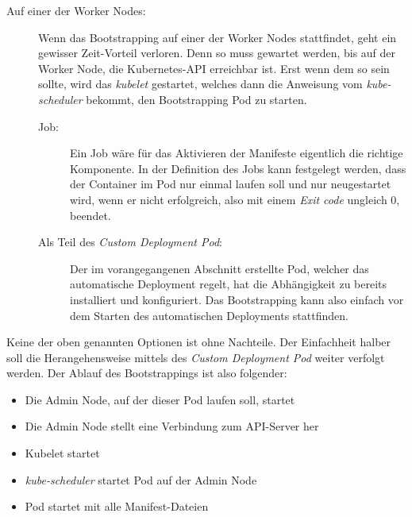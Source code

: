 \begin{description}
  \item[Auf einer der Worker Nodes:]
  Wenn das Bootstrapping auf einer der Worker Nodes stattfindet, geht ein gewisser
  Zeit-Vorteil verloren. Denn so muss gewartet werden, bis auf
  der Worker Node, die Kubernetes-API erreichbar ist. Erst wenn dem so sein sollte,
  wird das \emph{kubelet} gestartet, welches dann die Anweisung vom
  \emph{kube-scheduler} bekommt, den Bootstrapping Pod zu starten.
  \begin{description}
    \item[Job:]
    Ein Job wäre für das Aktivieren der Manifeste eigentlich die richtige
    Komponente.
    In der Definition des Jobs kann festgelegt werden, dass der Container
    im Pod nur einmal laufen soll und nur neugestartet wird, wenn er
    nicht erfolgreich, also mit einem \emph{Exit code} ungleich 0, beendet.
    \item[Als Teil des \emph{Custom Deployment Pod}:]
    Der im vorangegangenen Abschnitt erstellte Pod, welcher das automatische
    Deployment regelt, hat die Abhängigkeit zu  bereits
    installiert und konfiguriert.
    Das Bootstrapping kann also einfach vor dem Starten des automatischen
    Deployments stattfinden.
  \end{description}
\end{description}

Keine der oben genannten Optionen ist ohne Nachteile. Der Einfachheit halber
soll die Herangehensweise mittels des \emph{Custom Deployment Pod} weiter
verfolgt werden.
Der Ablauf des Bootstrappings ist also folgender:
\begin{itemize}
  \item Die Admin Node, auf der dieser Pod laufen soll, startet
  \item Die Admin Node stellt eine Verbindung zum API-Server her
  \item Kubelet startet
  \item \emph{kube-scheduler} startet Pod auf der Admin Node
  \item Pod startet mit  alle Manifest-Dateien
\end{itemize}

